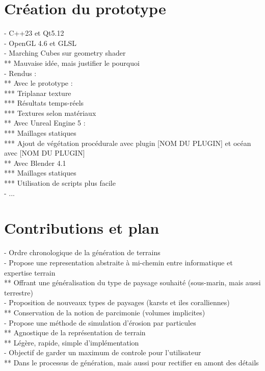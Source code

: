\section{Création du prototype}
- C++23 et Qt5.12 \\
- OpenGL 4.6 et GLSL \\
- Marching Cubes sur geometry shader \\
** Mauvaise idée, mais justifier le pourquoi \\
- Rendus :\\
** Avec le prototype : \\
*** Triplanar texture \\
*** Résultats temps-réels \\
*** Textures selon matériaux \\
** Avec Unreal Engine 5 : \\
*** Maillages statiques \\
*** Ajout de végétation procédurale avec plugin [NOM DU PLUGIN] et océan avec [NOM DU PLUGIN] \\
** Avec Blender 4.1 \\
*** Maillages statiques \\
*** Utilisation de scripts plus facile \\
- ...

\section{Contributions et plan}
- Ordre chronologique de la génération de terrains \\
- Propose une representation abstraite à mi-chemin entre informatique et expertise terrain \\
** Offrant une généralisation du type de paysage souhaité (sous-marin, mais aussi terrestre) \\
- Proposition de nouveaux types de paysages (karsts et iles coralliennes) \\
** Conservation de la notion de parcimonie (volumes implicites) \\
- Propose une méthode de simulation d'érosion par particules \\
** Agnostique de la représentation de terrain \\
** Légère, rapide, simple d'implémentation \\
- Objectif de garder un maximum de controle pour l'utilisateur \\ 
** Dans le processus de génération, mais aussi pour rectifier en amont des détails

